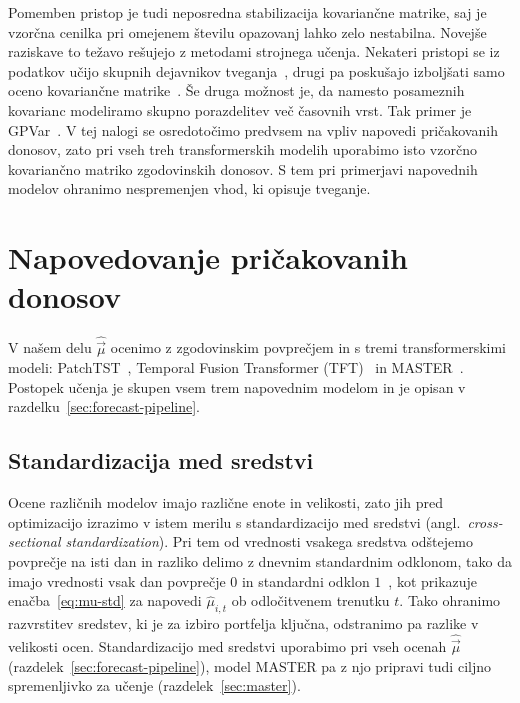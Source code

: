 \documentclass[9pt]{style/friteza}
\begin{document}
Pomemben pristop je tudi neposredna stabilizacija kovariančne matrike, saj je vzorčna cenilka pri omejenem številu opazovanj lahko zelo nestabilna. Novejše raziskave to težavo rešujejo z metodami strojnega učenja. Nekateri pristopi se iz podatkov učijo skupnih dejavnikov tveganja~\cite{lin2021deeprisk}, drugi pa poskušajo izboljšati samo oceno kovariančne matrike~\cite{yang2025}. Še druga možnost je, da namesto posameznih kovarianc modeliramo skupno porazdelitev več časovnih vrst. Tak primer je GPVar~\cite{salinas2019}. V tej nalogi se osredotočimo predvsem na vpliv napovedi pričakovanih donosov, zato pri vseh treh transformerskih modelih uporabimo isto vzorčno kovariančno matriko zgodovinskih donosov. S tem pri primerjavi napovednih modelov ohranimo nespremenjen vhod, ki opisuje tveganje.


\section{Napovedovanje pričakovanih donosov}\label{sec:mu}

V našem delu $\hat{\vec{\mu}}$ ocenimo z zgodovinskim povprečjem in s tremi transformerskimi modeli: PatchTST~\cite{nie2023patchtst}, Temporal Fusion Transformer (TFT)~\cite{lim2021tft} in MASTER~\cite{li2024master}. Postopek učenja je skupen vsem trem napovednim modelom in je opisan v razdelku~\ref{sec:forecast-pipeline}.

\subsection{Standardizacija med sredstvi}\label{sec:std}
Ocene različnih modelov imajo različne enote in velikosti, zato jih pred optimizacijo izrazimo v istem merilu s standardizacijo med sredstvi (angl.\ \emph{cross-sectional standardization}). Pri tem od vrednosti vsakega sredstva odštejemo povprečje na isti dan in razliko delimo z dnevnim standardnim odklonom, tako da imajo vrednosti vsak dan povprečje $0$ in standardni odklon $1$~\cite{li2024master,yang2020qlib}, kot prikazuje enačba~\eqref{eq:mu-std} za napovedi $\hat{\mu}_{i,t}$ ob odločitvenem trenutku $t$. Tako ohranimo razvrstitev sredstev, ki je za izbiro portfelja ključna, odstranimo pa razlike v velikosti ocen. Standardizacijo med sredstvi uporabimo pri vseh ocenah $\hat{\vec{\mu}}$ (razdelek~\ref{sec:forecast-pipeline}), model MASTER pa z njo pripravi tudi ciljno spremenljivko za učenje (razdelek~\ref{sec:master}). 
\end{document}
